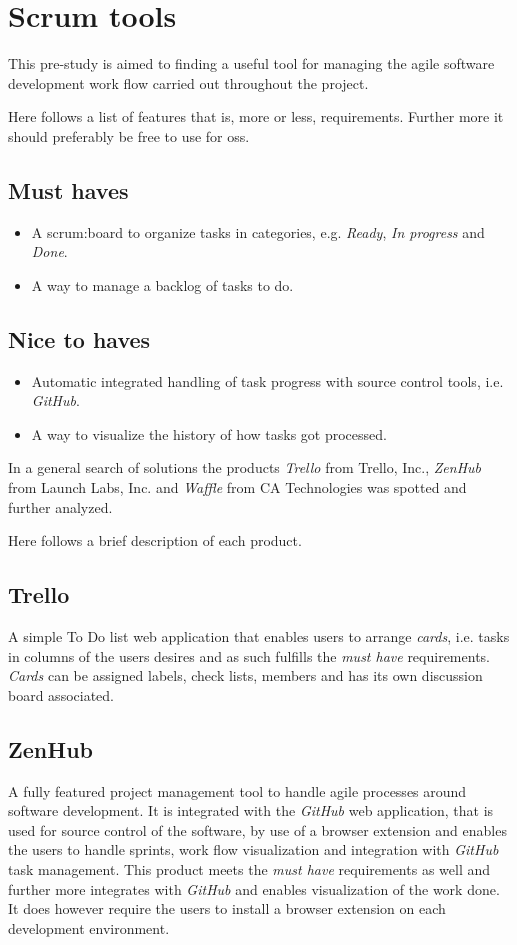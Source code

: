 \section{Scrum tools}\label{preStudy:scrum}
This pre-study is aimed to finding a useful tool for managing the agile software development work flow carried out throughout the project.

Here follows a list of features that is, more or less, requirements. Further more it should preferably be free to use for \gls{oss}.

\subsection*{Must haves}
\begin{itemize}
\item A \gls{scrum:board} to organize tasks in categories, e.g. \textit{Ready}, \textit{In progress} and \textit{Done}.
\item A way to manage a backlog of tasks to do.
\end{itemize}

\subsection*{Nice to haves}
\begin{itemize}
\item Automatic integrated handling of task progress with source control tools, i.e. \textit{GitHub}.
\item A way to visualize the history of how tasks got processed.
\end{itemize}

In a general search of solutions the products \textit{Trello} from Trello, Inc., \textit{ZenHub} from Launch Labs, Inc. and \textit{Waffle} from CA Technologies was spotted and further analyzed.

Here follows a brief description of each product.

\subsection*{Trello}
A simple To Do list web application that enables users to arrange \textit{cards}, i.e. tasks in columns of the users desires and as such fulfills the \textit{must have} requirements.
\textit{Cards} can be assigned labels, check lists, members and has its own discussion board associated.

\subsection*{ZenHub}
A fully featured project management tool to handle agile processes around software development. 
It is integrated with the \textit{GitHub} web application, that is used for source control of the software, by use of a browser extension and enables the users to handle sprints, work flow visualization and integration with \textit{GitHub} task management. 
This product meets the \textit{must have} requirements as well and further more integrates with \textit{GitHub} and enables visualization of the work done.
It does however require the users to install a browser extension on each development environment.

